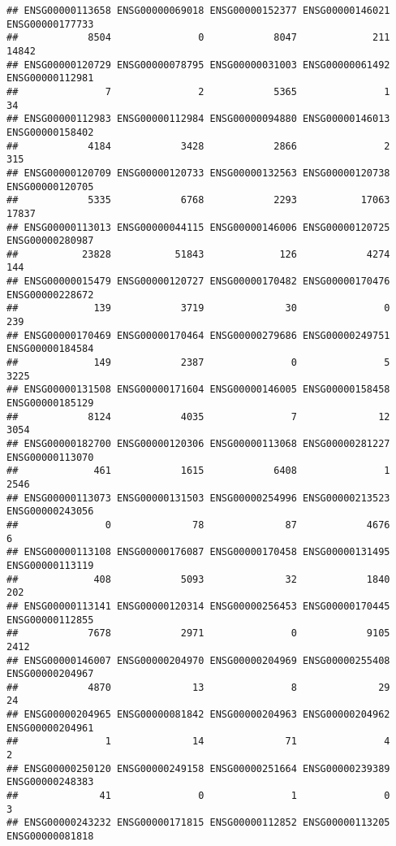 \documentclass[
]{article}
\begin{document}
\begin{verbatim}
## ENSG00000113658 ENSG00000069018 ENSG00000152377 ENSG00000146021 ENSG00000177733 
##            8504               0            8047             211           14842 
## ENSG00000120729 ENSG00000078795 ENSG00000031003 ENSG00000061492 ENSG00000112981 
##               7               2            5365               1              34 
## ENSG00000112983 ENSG00000112984 ENSG00000094880 ENSG00000146013 ENSG00000158402 
##            4184            3428            2866               2             315 
## ENSG00000120709 ENSG00000120733 ENSG00000132563 ENSG00000120738 ENSG00000120705 
##            5335            6768            2293           17063           17837 
## ENSG00000113013 ENSG00000044115 ENSG00000146006 ENSG00000120725 ENSG00000280987 
##           23828           51843             126            4274             144 
## ENSG00000015479 ENSG00000120727 ENSG00000170482 ENSG00000170476 ENSG00000228672 
##             139            3719              30               0             239 
## ENSG00000170469 ENSG00000170464 ENSG00000279686 ENSG00000249751 ENSG00000184584 
##             149            2387               0               5            3225 
## ENSG00000131508 ENSG00000171604 ENSG00000146005 ENSG00000158458 ENSG00000185129 
##            8124            4035               7              12            3054 
## ENSG00000182700 ENSG00000120306 ENSG00000113068 ENSG00000281227 ENSG00000113070 
##             461            1615            6408               1            2546 
## ENSG00000113073 ENSG00000131503 ENSG00000254996 ENSG00000213523 ENSG00000243056 
##               0              78              87            4676               6 
## ENSG00000113108 ENSG00000176087 ENSG00000170458 ENSG00000131495 ENSG00000113119 
##             408            5093              32            1840             202 
## ENSG00000113141 ENSG00000120314 ENSG00000256453 ENSG00000170445 ENSG00000112855 
##            7678            2971               0            9105            2412 
## ENSG00000146007 ENSG00000204970 ENSG00000204969 ENSG00000255408 ENSG00000204967 
##            4870              13               8              29              24 
## ENSG00000204965 ENSG00000081842 ENSG00000204963 ENSG00000204962 ENSG00000204961 
##               1              14              71               4               2 
## ENSG00000250120 ENSG00000249158 ENSG00000251664 ENSG00000239389 ENSG00000248383 
##              41               0               1               0               3 
## ENSG00000243232 ENSG00000171815 ENSG00000112852 ENSG00000113205 ENSG00000081818 

\end{verbatim}
\end{document}
